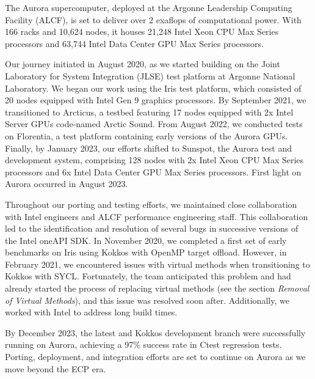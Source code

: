 
The Aurora supercomputer, deployed at the Argonne Leadership Computing Facility (ALCF), is set to deliver over 2 exaflops of computational power. With 166 racks and 10,624 nodes, it houses 21,248 Intel Xeon CPU Max Series processors and 63,744 Intel Data Center GPU Max Series processors.

Our journey initiated in August 2020, as we started building \vtkm on the Joint Laboratory for System Integration (JLSE) test platform at Argonne National Laboratory. We began our work using the Iris test platform, which consisted of 20 nodes equipped with Intel Gen 9 graphics processors. By September 2021, we transitioned to Arcticus, a testbed featuring 17 nodes equipped with 2x Intel Server GPUs code-named Arctic Sound. From August 2022, we conducted tests on Florentia, a test platform containing early versions of the Aurora GPUs. Finally, by January 2023, our efforts shifted to Sunspot, the Aurora test and development system, comprising 128 nodes with 2x Intel Xeon CPU Max Series processors and 6x Intel Data Center GPU Max Series processors. First light on Aurora occurred in August 2023.

Throughout our porting and testing efforts, we maintained close collaboration with Intel engineers and ALCF performance engineering staff. This collaboration led to the identification and resolution of several bugs in successive versions of the Intel oneAPI SDK. In November 2020, we completed a first set of early \vtkm benchmarks on Iris using Kokkos with OpenMP target offload. However, in February 2021, we encountered issues with virtual methods when transitioning to Kokkos with SYCL. Fortunately, the team anticipated this problem and had already started the process of replacing virtual methods (see the section {\it Removal of Virtual Methods}), and this issue was resolved soon after. Additionally, we worked with Intel to address long build times.

By December 2023, the latest \vtkm and Kokkos development branch were successfully running on Aurora, achieving a 97\% success rate in Ctest regression tests. Porting, deployment, and integration efforts are set to continue on Aurora as we move beyond the ECP era.
